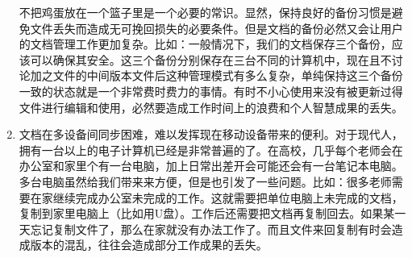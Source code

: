 \begin{enumerate}
不把鸡蛋放在一个篮子里是一个必要的常识。显然，保持良好的备份习惯是避免文件丢失而造成无可挽回损失的必要条件。但是文档的备份必然又会让用户的文档管理工作更加复杂。比如：一般情况下，我们的文档保存三个备份，应该可以确保其安全。这三个备份分别保存在三台不同的计算机中，现在且不讨论加之文件的中间版本文件后这种管理模式有多么复杂，单纯保持这三个备份一致的状态就是一个非常费时费力的事情。有时不小心使用来没有被更新过得文件进行编辑和使用，必然要造成工作时间上的浪费和个人智慧成果的丢失。
\item 文档在多设备间同步困难，难以发挥现在移动设备带来的便利。对于现代人，拥有一台以上的电子计算机已经是非常普遍的了。在高校，几乎每个老师会在办公室和家里个有一台电脑，加上日常出差开会可能还会有一台笔记本电脑。多台电脑虽然给我们带来来方便，但是也引发了一些问题。比如：很多老师需要在家继续完成办公室未完成的工作。这就需要把单位电脑上未完成的文档，复制到家里电脑上（比如用U盘）。工作后还需要把文档再复制回去。如果某一天忘记复制文件了，那么在家就没有办法工作了。而且文件来回复制有时会造成版本的混乱，往往会造成部分工作成果的丢失。


\end{enumerate}

